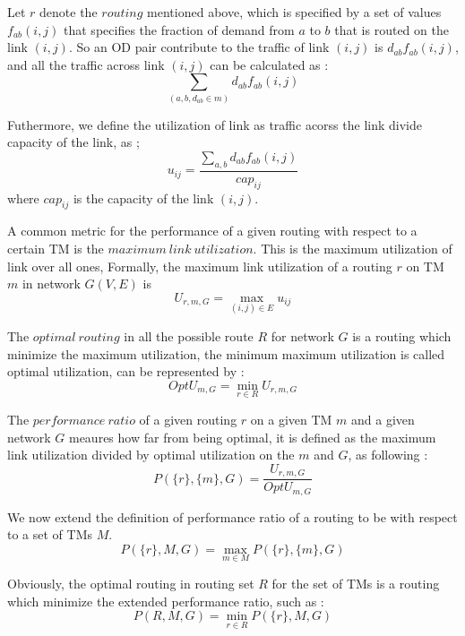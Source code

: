 \documentclass[conference]{IEEEtran}
\begin{document}
Let $r$ denote the $routing$ mentioned above, which is specified by a set of values $f_{ab}(i,j)$ that specifies the 
fraction of demand from $a$ to $b$ that is routed on the link $(i,j)$. So an OD pair contribute to the traffic of 
link $(i,j)$ is $d_{ab}f_{ab}(i,j)$, and all the traffic across link $(i,j)$ can be calculated as :
\begin{equation}
	\sum_{(a,b,d_{ab}\in m)} d_{ab}f_{ab}(i,j)
\end{equation}

Futhermore, we define the utilization of link as traffic acorss the link divide capacity of the link, as ;
\begin{equation}
	u_{ij} = \frac{\sum_{a,b} d_{ab}f_{ab}(i,j)}{cap_{ij}}
\end{equation}
where $cap_{ij}$ is the capacity of the link $(i,j)$.

A common metric for the performance of a given routing with respect to a certain TM is the $maximum\ link\ utilization$.
This is the maximum utilization of link over all ones, Formally, the maximum link utilization of a routing $r$ on 
TM $m$ in network $G(V,E)$ is 
\begin{equation}
	U_{r, m, G} = \max_{(i,j)\in E} u_{ij}
\end{equation}

The $optimal\ routing$ in all the possible route $R$ for network $G$ is a routing which minimize the maximum utilization,
the minimum maximum utilization is called optimal utilization, can be represented by :
\begin{equation}
	OptU_{m, G} = \min_{r\in R} U_{r, m, G}
\end{equation}

The $performance\ ratio$ of a given routing $r$ on a given TM $m$ and a given network $G$ meaures how far from being 
optimal, it is defined as the maximum link utilization divided by optimal utilization on the $m$ and $G$, as following : 
\begin{equation}
	P(\{ r \},\{ m \}, G) = \frac{U_{r,m,G}}{OptU_{m,G}}
\end{equation}

We now extend the definition of performance ratio of a routing to be with respect to a set of TMs $M$. 
\begin{equation}
	P(\{ r \}, M, G) = \max_{m\in M} P(\{ r \}, \{ m \}, G)
\end{equation}

Obviously, the optimal routing in routing set $R$ for the set of TMs is a routing which minimize the extended 
performance ratio, such as :
\begin{equation}
	P(R, M, G) = \min_{r\in R} P(\{ r \}, M, G)
\end{equation}
\end{document}
